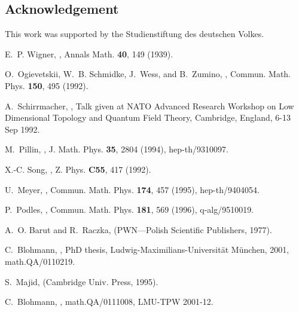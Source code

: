 \documentclass[12pt,a4paper]{article}
\begin{document}
\subsection*{Acknowledgement}
This work was supported by the Studienstiftung des deut\-schen Volkes.
 

\begin{thebibliography}{10}

E.~P. Wigner,
,
\newblock Annals Math. {\bf 40}, 149 (1939).

O.~Ogievetskii, W.~B. Schmidke, J.~Wess, and B.~Zumino,
,
\newblock Commun. Math. Phys. {\bf 150}, 495 (1992).

A.~Schirrmacher,
,
\newblock Talk given at NATO Advanced Research Workshop on Low Dimensional
  Topology and Quantum Field Theory, Cambridge, England, 6-13 Sep 1992.

M.~Pillin,
,
\newblock J. Math. Phys. {\bf 35}, 2804 (1994), hep-th/9310097.

X.-C. Song,
,
\newblock Z. Phys. {\bf C55}, 417 (1992).

U.~Meyer,
,
\newblock Commun. Math. Phys. {\bf 174}, 457 (1995), hep-th/9404054.

P.~Podles,
,
\newblock Commun. Math. Phys. {\bf 181}, 569 (1996), q-alg/9510019.

A.~O. Barut and R.~Raczka,
 (PWN---Polish
  Scientific Publishers, 1977).

C.~Blohmann,
,
\newblock PhD thesis, Ludwig-Maximilians-Universit{\"a}t M{\"unchen}, 2001,
  math.QA/0110219.

S.~Majid,
 (Cambridge Univ. Press,
  1995).

C.~Blohmann,
,
\newblock math.QA/0111008, LMU-TPW 2001-12.


\end{thebibliography}
\end{document}
